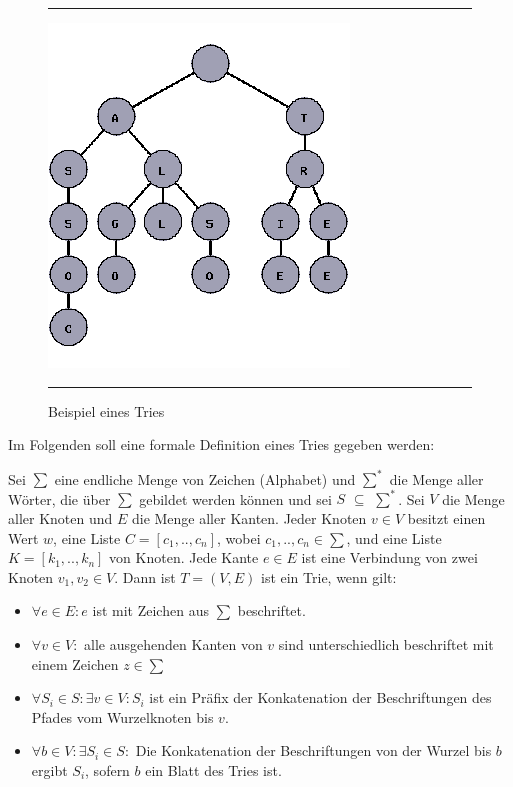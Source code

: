 \begin{figure}
	\centering
	\rule{\textwidth}{0.4pt}
	\includegraphics[scale=0.7]{../Abbildungen/trie.png}
	\rule{\textwidth}{0.4pt}
	\caption{Beispiel eines Tries \cite{trie_Abb}}
	\label{fig:trie}
\end{figure}

Im Folgenden soll eine formale Definition eines Tries gegeben werden:
\begin{defi}[Trie]\cite{Trie_wiki}
	Sei $\sum$ eine endliche Menge von Zeichen (Alphabet) und $\sum^{*}$ die Menge aller Wörter, die über $\sum$ gebildet werden können und sei $S$ $\subseteq$ $\sum^{*}$. Sei $V$ die Menge aller Knoten und $E$ die Menge aller Kanten. Jeder Knoten $v \in V$ besitzt einen Wert $w$, eine Liste $C = [c_1, .., c_n]$, wobei $c_1, .., c_n \in \sum$, und eine Liste $K = [k_1, .., k_n]$ von Knoten. Jede Kante $e \in E$ ist eine Verbindung von zwei Knoten $v_1, v_2 \in V$. Dann ist $T = (V, E)$ ist ein Trie, wenn gilt:
	
	\begin{itemize}
		\item $\forall e \in E: e$ ist mit Zeichen aus $\sum$ beschriftet.
		\item $\forall v \in V:$ alle ausgehenden Kanten von $v$ sind unterschiedlich beschriftet mit einem Zeichen $z \in \sum$
		\item $\forall S_i \in S: \exists v \in V: S_i$ ist ein Präfix der Konkatenation der Beschriftungen des Pfades vom Wurzelknoten bis $v$.
		\item $\forall b \in V: \exists S_i \in S:$ Die Konkatenation der Beschriftungen von der Wurzel bis $b$ ergibt $S_i$, sofern $b$ ein Blatt des Tries ist.
	\end{itemize}
	
\end{defi}

